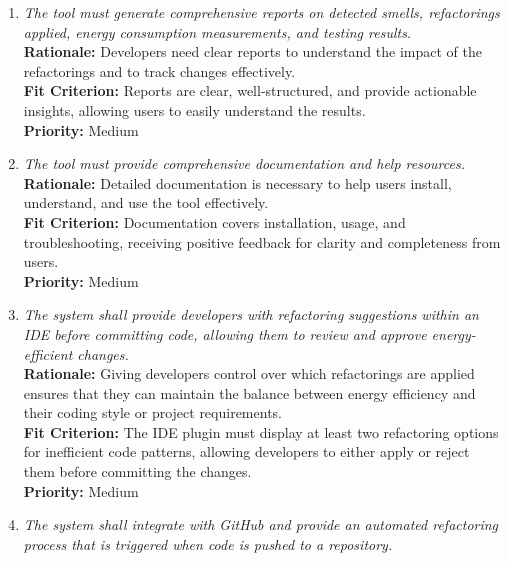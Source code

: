 \documentclass[12pt]{article}
\begin{document}
\begin{enumerate}[label=FR \arabic*., wide=0pt, leftmargin=*]
    {\bf Rationale:} The tool leverages features available in Python 3.10 for its operation while ensuring compatibility with analyzing codebases written in Python 3.8 and 3.9, which are the most widely adopted recent major versions in use.\\
    {\bf Fit Criterion:} The tool operates correctly in a Python 3.10 environment and successfully analyzes and refactors code written for Python versions 3.8, 3.9, and newer.\\
    {\bf Priority:} Medium
    \item \emph{The tool must generate comprehensive reports on detected smells, refactorings applied, energy consumption measurements, and testing results.}\\[2mm]
    {\bf Rationale:} Developers need clear reports to understand the impact of the refactorings and to track changes effectively.\\
    {\bf Fit Criterion:} Reports are clear, well-structured, and provide actionable insights, allowing users to easily understand the results.\\
    {\bf Priority:} Medium
    \item \emph{The tool must provide comprehensive documentation and help resources.}\\[2mm]
    {\bf Rationale:} Detailed documentation is necessary to help users install, understand, and use the tool effectively.\\
    {\bf Fit Criterion:} Documentation covers installation, usage, and troubleshooting, receiving positive feedback for clarity and completeness from users.\\
    {\bf Priority:} Medium
    \item \emph{The system shall provide developers with refactoring suggestions within an IDE before committing code, allowing them to review and approve energy-efficient changes.}\\[2mm]
    {\bf Rationale:} Giving developers control over which refactorings are applied ensures that they can maintain the balance between energy efficiency and their coding style or project requirements.\\
    {\bf Fit Criterion:} The IDE plugin must display at least two refactoring options for inefficient code patterns, allowing developers to either apply or reject them before committing the changes.\\
    {\bf Priority:} Medium
    \item \emph{The system shall integrate with GitHub and provide an automated refactoring process that is triggered when code is pushed to a repository.}\\[2mm]

\end{enumerate}
\end{document}
